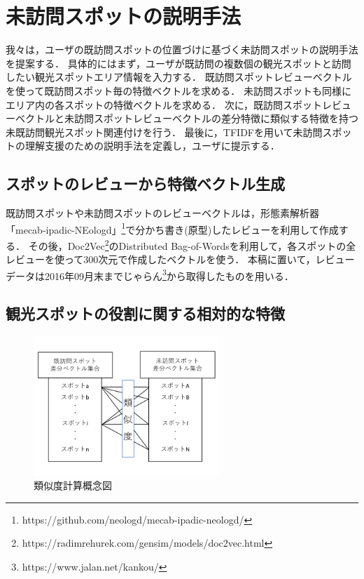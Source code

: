 \documentclass{deimj}
\begin{document}
\section{未訪問スポットの説明手法}
\label{sec:未訪問スポットの説明手法}
我々は，ユーザの既訪問スポットの位置づけに基づく未訪問スポットの説明手法を提案する．
具体的にはまず，ユーザが既訪問の複数個の観光スポットと訪問したい観光スポットエリア情報を入力する．
既訪問スポットレビューベクトルを使って既訪問スポット毎の特徴ベクトルを求める．
未訪問スポットも同様にエリア内の各スポットの特徴ベクトルを求める．
次に，既訪問スポットレビューベクトルと未訪問スポットレビューベクトルの差分特徴に類似する特徴を持つ未既訪問観光スポット関連付けを行う．
最後に，TFIDFを用いて未訪問スポットの理解支援のための説明手法を定義し，ユーザに提示する．

\subsection{スポットのレビューから特徴ベクトル生成}
\label{subsec:スポットのレビューから特徴ベクトル生成}
既訪問スポットや未訪問スポットのレビューベクトルは，形態素解析器「mecab-ipadic-NEologd」\footnote{https://github.com/neologd/mecab-ipadic-neologd/}で分かち書き(原型)したレビューを利用して作成する．
その後，Doc2Vec\footnote{https://radimrehurek.com/gensim/models/doc2vec.html}のDistributed Bag-of-Wordsを利用して，各スポットの全レビューを使って300次元で作成したベクトルを使う．
本稿に置いて，レビューデータは2016年09月末までじゃらん\footnote{https://www.jalan.net/kankou/}から取得したものを用いる．

\subsection{観光スポットの役割に関する相対的な特徴}
\label{subsec:観光スポットの役割に関する相対的な特徴}

\begin{figure}[t]
  \begin{center}
    \includegraphics[clip,width=7.0cm]{picture/Photo_CosSim_jap.png}
    \caption{類似度計算概念図}
    \label{fig:photo_cossim}
    \end{center}
\end{figure}
\end{document}
